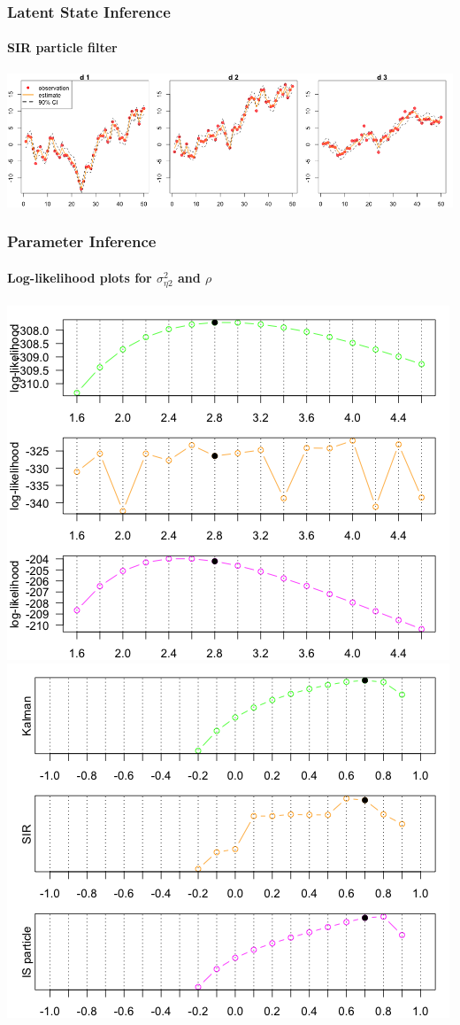\documentclass[11pt]{beamer}
\begin{document}
\begin{frame}
\frametitle{Latent State Inference}
\framesubtitle{SIR particle filter}
\centering
\includegraphics[scale=0.35]{mllm-estimate-sir}
\end{frame}

\begin{frame}
\frametitle{Parameter Inference}
\framesubtitle{Log-likelihood plots for $\sigma_{\eta 2}^2$ and $\rho$}
\centering
\includegraphics[scale=0.33]{mllm-loglik-var2}
\includegraphics[scale=0.33]{mllm-loglik-rho}
\end{frame}
\end{document}
